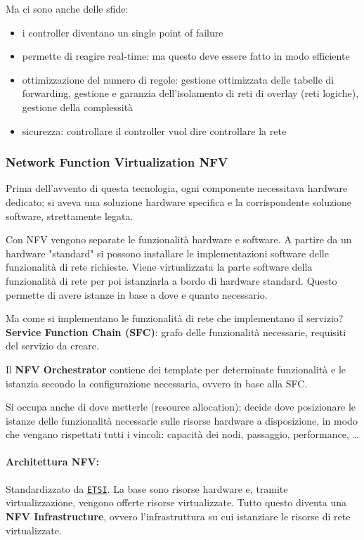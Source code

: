 Ma ci sono anche delle sfide: 
\begin{itemize}
	\item i controller diventano un single point of failure

	\item permette di reagire real-time: ma questo deve essere fatto in modo efficiente

	\item ottimizzazione del numero di regole: gestione ottimizzata delle tabelle di forwarding, gestione e garanzia dell'isolamento di reti di overlay (reti logiche), gestione della complessità

	\item sicurezza: controllare il controller vuol dire controllare la rete
\end{itemize}

\subsubsection{Network Function Virtualization NFV}

Prima dell'avvento di questa tecnologia, ogni componente necessitava hardware dedicato; si aveva una soluzione hardware specifica e la corrispondente soluzione software, strettamente legata.

Con NFV vengono separate le funzionalità hardware e software. A partire da un hardware "standard" si possono installare le implementazioni software delle funzionalità di rete richieste. Viene virtualizzata la parte software della funzionalità di rete per poi istanziarla a bordo di hardware standard. Questo permette di avere istanze in base a dove e quanto necessario. 

Ma come si implementano le funzionalità di rete che implementano il servizio? \textbf{Service Function Chain (SFC)}: grafo delle funzionalità necessarie, requisiti del servizio da creare.

Il \textbf{NFV Orchestrator} contiene dei template per determinate funzionalità e le istanzia secondo la configurazione necessaria, ovvero in base alla SFC. 

Si occupa anche di dove metterle (resource allocation); decide dove posizionare le istanze delle funzionalità necessarie sulle risorse hardware a disposizione, in modo che vengano rispettati tutti i vincoli: capacità dei nodi, passaggio, performance, \dots

\paragraph{Architettura NFV:} Standardizzato da \href{https://www.etsi.org/}{\texttt{ETSI}}. La base sono risorse hardware e, tramite virtualizzazione, vengono offerte risorse virtualizzate. Tutto questo diventa una \textbf{NFV Infrastructure}, ovvero l'infrastruttura su cui istanziare le risorse di rete virtualizzate.

